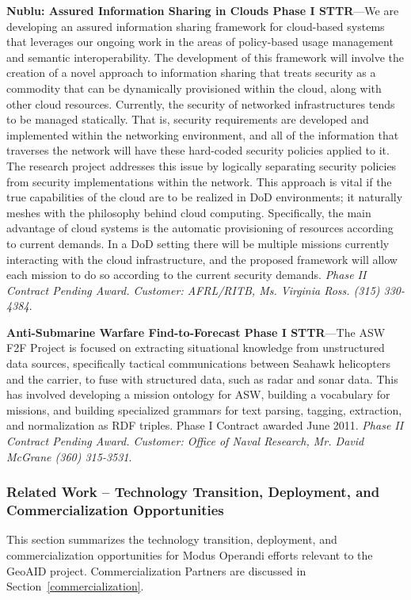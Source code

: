 \documentclass{sbir}
\begin{document}
{\bf Nublu: Assured Information Sharing in Clouds Phase I STTR}---We are developing an assured information sharing framework for cloud-based systems that leverages our ongoing work in the areas of policy-based usage management and semantic interoperability. The development of this framework will involve the creation of a novel approach to information sharing that treats security as a commodity that can be dynamically provisioned within the cloud, along with other cloud resources. Currently, the security of networked infrastructures tends to be managed statically. That is, security requirements are developed and implemented within the networking environment, and all of the information that traverses the network will have these hard-coded security policies applied to it. The research project addresses this issue by logically separating security policies from security implementations within the network. This approach is vital if the true capabilities of the cloud are to be realized in DoD environments; it naturally meshes with the philosophy behind cloud computing. Specifically, the main advantage of cloud systems is the automatic provisioning of resources according to current demands. In a DoD setting there will be multiple missions currently interacting with the cloud infrastructure, and the proposed framework will allow each mission to do so according to the current security demands. \emph{Phase II Contract Pending Award. Customer: AFRL/RITB, Ms. Virginia Ross. (315) 330-4384}.

{\bf Anti-Submarine Warfare Find-to-Forecast Phase I STTR}---The ASW F2F Project is focused on extracting situational knowledge from unstructured data sources, specifically tactical communications between Seahawk helicopters and the carrier, to fuse with structured data, such as radar and sonar data. This has involved developing a mission ontology for ASW, building a vocabulary for missions, and building specialized grammars for text parsing, tagging, extraction, and normalization as RDF triples. Phase I Contract awarded June 2011. \emph{Phase II Contract Pending Award. Customer: Office of Naval Research, Mr. David McGrane (360) 315-3531}.

\subsubsection{Related Work -- Technology Transition, Deployment, and Commercialization Opportunities}
This section summarizes the technology transition, deployment, and commercialization opportunities for Modus Operandi efforts relevant to the GeoAID project. Commercialization Partners are discussed in Section~\ref{commercialization}.
\end{document}
